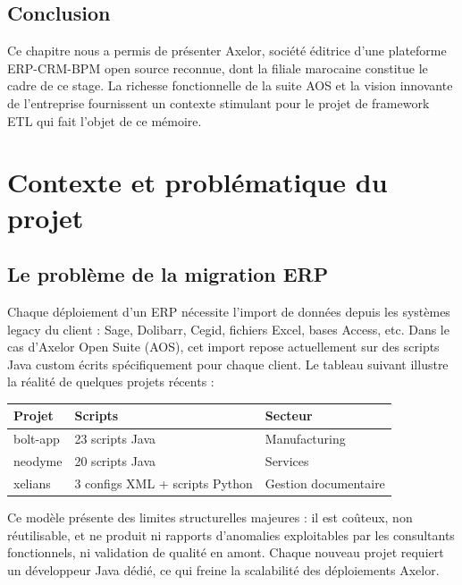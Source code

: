 \documentclass[a4paper,12pt]{article}
\begin{document}
\subsection{Conclusion}

Ce chapitre nous a permis de présenter Axelor, société éditrice d'une plateforme ERP-CRM-BPM open source reconnue, dont la filiale marocaine constitue le cadre de ce stage. La richesse fonctionnelle de la suite AOS et la vision innovante de l'entreprise fournissent un contexte stimulant pour le projet de framework ETL qui fait l'objet de ce mémoire.

\newpage
\section{Contexte et problématique du projet}

\subsection{Le problème de la migration ERP}

Chaque déploiement d'un ERP nécessite l'import de données depuis les systèmes legacy du client : Sage, Dolibarr, Cegid, fichiers Excel, bases Access, etc. Dans le cas d'Axelor Open Suite (AOS), cet import repose actuellement sur des scripts Java custom écrits spécifiquement pour chaque client. Le tableau suivant illustre la réalité de quelques projets récents :

\begin{center}
\begin{tabular}{|l|l|l|}
\hline
\textbf{Projet} & \textbf{Scripts} & \textbf{Secteur} \\
\hline
bolt-app & 23 scripts Java & Manufacturing \\
\hline
neodyme  & 20 scripts Java & Services \\
\hline
xelians  & 3 configs XML + scripts Python & Gestion documentaire \\
\hline
\end{tabular}
\end{center}

Ce modèle présente des limites structurelles majeures : il est coûteux, non réutilisable, et ne produit ni rapports d'anomalies exploitables par les consultants fonctionnels, ni validation de qualité en amont. Chaque nouveau projet requiert un développeur Java dédié, ce qui freine la scalabilité des déploiements Axelor.
\end{document}
